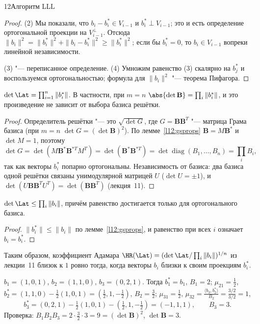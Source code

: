 \begin{lecture}{12}{Алгоритм LLL}
\begin{proof}
(2) Мы показали, что $b_i - b_i^* \in V_{i-1}$ и $b_i^* \perp V_{i-1}$; это и есть
определение ортогональной проекции на $V_{i-1}^\perp$. Отсюда
$\|b_i\|^2 = \|b_i^*\|^2 + \|b_i - b_i^*\|^2 \ge \|b_i^*\|^2$; если бы $b_i^* = 0$, то
$b_i \in V_{i-1}$ вопреки линейной независимости.

(3) "--- переписанное определение. (4) Умножим равенство (3) скалярно на $b_j^*$ и воспользуемся
ортогональностью; формула для $\|b_i\|^2$ "--- теорема Пифагора.
\end{proof}

\begin{theorem}\label{l12:det}
$\det \Lat = \prod_{i=1}^n \|b_i^*\|$. В частности, при $m = n$
$\abs{\det \mathbf{B}} = \prod_{i} \|b_i^*\|$, и это произведение не зависит от выбора базиса
решётки.
\end{theorem}

\begin{proof}
Определитель решётки "--- это $\sqrt{\det G}$, где $G = \mathbf{B}\mathbf{B}^T$ "--- матрица
Грама базиса (при $m = n$ $\det G = (\det \mathbf{B})^2$). По лемме~\ref{l12:gsprops}
$\mathbf{B} = M \mathbf{B}^*$ и $\det M = 1$, поэтому
\[
  \det G = \det(M \mathbf{B}^* \mathbf{B}^{*T} M^T) = \det(\mathbf{B}^*\mathbf{B}^{*T})
  = \det \operatorname{diag}(B_1, \dots, B_n) = \prod_i B_i,
\]
так как векторы $b_i^*$ попарно ортогональны. Независимость от базиса: два базиса одной
решётки связаны унимодулярной матрицей $U$ ($\det U = \pm 1$), и
$\det(U\mathbf{B}\mathbf{B}^T U^T) = \det(\mathbf{B}\mathbf{B}^T)$ (лекция~11).
\end{proof}

\begin{corollary}
$\det \Lat \le \prod_i \|b_i\|$, причём равенство достигается только для ортогонального
базиса.
\end{corollary}

\begin{proof}
$\|b_i^*\| \le \|b_i\|$ по лемме~\ref{l12:gsprops}, и равенство при всех $i$ означает
$b_i = b_i^*$.
\end{proof}

Таким образом, коэффициент Адамара $\HR(\Lat) = (\det\Lat / \prod_i \|b_i\|)^{1/n}$ из
лекции~11 близок к $1$ ровно тогда, когда векторы $b_i$ близки к своим проекциям $b_i^*$.

\begin{example}\label{l12:gsex}
$b_1 = (1, 0, 1)$, $b_2 = (1, 1, 0)$, $b_3 = (0, 2, 1)$. Тогда $b_1^* = b_1$, $B_1 = 2$;
$\mu_{21} = \frac{1}{2}$, $b_2^* = (1, 1, 0) - \frac12 (1, 0, 1) = (\frac12, 1, -\frac12)$,
$B_2 = \frac32$; $\mu_{31} = \frac12$,
$\mu_{32} = \frac{\langle b_3, b_2^* \rangle}{B_2} = \frac{3/2}{3/2} = 1$,
\[
  b_3^* = (0, 2, 1) - \tfrac12 (1, 0, 1) - (\tfrac12, 1, -\tfrac12) = (-1, 1, 1), \qquad B_3 = 3.
\]
Проверка: $B_1 B_2 B_3 = 2 \cdot \frac32 \cdot 3 = 9 = (\det \mathbf{B})^2$, $\det\mathbf{B} = 3$.
\end{example}


\end{lecture}
